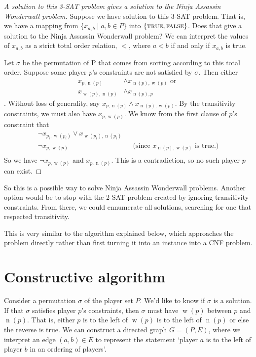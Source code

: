 \documentclass[12pt]{article}
\DeclareMathOperator{\w}{w}
\DeclareMathOperator{\n}{n}
\begin{document}
    \begin{proof}[A solution to this 3-SAT problem gives a solution to the Ninja Assassin Wonderwall problem]
    Suppose we have solution to this 3-SAT problem. That is, we have a mapping from $\{x_{a,b} \mid a,b \in P\}$ into $\{\textnormal{\scshape true}, \textnormal{\scshape false}\}$. Does that give a solution to the Ninja Assassin Wonderwall problem? We can interpret the values of $x_{a,b}$ as a strict total order relation, $<$, where $a<b$ if and only if $x_{a,b}$ is true. 

    Let $\sigma$ be the permutation of P that comes from sorting according to this total order. Suppose some player $p$'s constraints are not satisfied by $\sigma$. Then either 
    \begin{align*}
    x_{p,\n(p)} &\wedge x_{\n(p),\w(p)} \text{ or } \\
    x_{\w(p),\n(p)} &\wedge x_{\n(p),p}
    \end{align*}. Without loss of generality, say $x_{p,\n(p)} \wedge x_{\n(p),\w(p)}$. By the transitivity constraints, we must also have $x_{p,\w(p)}$. We know from the first clause of $p$'s constraint that 
    \begin{align*}
        \lnot x_{p_i, \w(p_i)} \vee x_{\w(p_i), \n(p_i)}\\
        \lnot x_{p, \w(p)} &&\text{(since $x_{\n(p),\w(p)}$ is true.)}\\
    \end{align*}
    So we have $\lnot x_{p, \w(p)}$ and $x_{p,\n(p)}$. This is a contradiction, so no such player $p$ can exist.
    \end{proof}

    So this is a possible way to solve Ninja Assassin Wonderwall problems. Another option would be to stop with the 2-SAT problem created by ignoring transitivity constraints. From there, we could ennumerate all solutions, searching for one that respected transitivity. %

    This is very similar to the algorithm explained below, which approaches the problem directly rather than first turning it into an instance into a CNF problem.

\section{Constructive algorithm}
    \label{sec:algorithm}
    Consider a permutation $\sigma$ of the player set $P$. We'd like to know if $\sigma$ is a solution. If that $\sigma$ satisfies player $p$'s constraints, then $\sigma$ must have $\w(p)$ between $p$ and $\n(p)$. That is, either $p$ is to the left of $\w(p)$ is to the left of $\n(p)$ or else the reverse is true. We can construct a directed graph $G=(P,E)$, where we interpret an edge $(a,b) \in E$ to represent the statement `player $a$ is to the left of player $b$ in an ordering of players'. 
\end{document}
